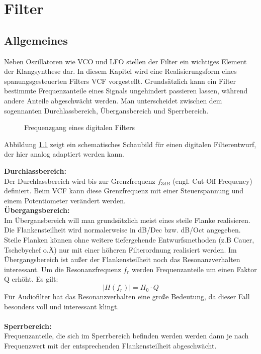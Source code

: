 \chapter{Filter}
\label{ch:concept}
\section{Allgemeines}
Neben Oszillatoren wie VCO und LFO stellen der Filter ein wichtiges Element der Klangsynthese dar.
In diesem Kapitel wird eine Realisierungsform eines spanungsgesteuerten Filters VCF vorgestellt. 
Grundsätzlich kann ein Filter bestimmte Frequenzanteile eines Signals ungehindert passieren lassen, während andere Anteile
abgeschwächt werden.
Man unterscheidet zwischen dem sogennanten Durchlassbereich, Übergansbereich und Sperrbereich.

\begin{figure}[h]
	\centering
	\setlength{\fboxsep}{1pt} %
	\setlength{\fboxrule}{1pt} %
	\caption{Frequenzgang eines digitalen Filters}
	\label{fig:toleranzschema}
\end{figure}
Abbildung \ref{fig:toleranzschema} zeigt ein schematisches Schaubild für einen digitalen Filterentwurf, der hier analog adaptiert werden kann.

\textbf{Durchlassbereich:}\\
Der Durchlassbereich wird bis zur Grenzfrequenz $f_{3dB}$ (engl. Cut-Off Frequency) definiert.
Beim VCF kann diese Grenzfrequenz mit einer Steuerspannung und einem Potentiometer verändert werden. \\

\textbf{Übergangsbereich:}\\
Im Übergansbereich will man grundsätzlich meist eines steile Flanke realisieren. Die Flankensteilheit wird normalerweise in dB/Dec bzw. dB/Oct angegeben.
Steile Flanken können ohne weitere tiefergehende Entwurfsmethoden (z.B Cauer, Tschebychef o.Ä) nur mit einer höheren Filterordnung realisiert werden.
Im Übergangsbereich ist außer der Flankensteilheit noch das Resonanzverhalten interessant. Um die Resonanzfrequenz $f_r$ werden Frequenzanteile um einen Faktor Q erhöht.  
Es gilt: 
\begin{equation}  \label{eq:1}
  |H(f_r)| = H_0 \cdot Q
\end{equation}
Für Audiofilter hat das Resonanzverhalten eine große Bedeutung, da dieser Fall besonders voll und interessant klingt.\\
\\
\textbf{Sperrbereich:}\\
Frequenzanteile, die sich im Sperrbereich befinden werden werden dann je nach Frequenzwert mit der entsprechenden Flankensteilheit abgeschwächt.


